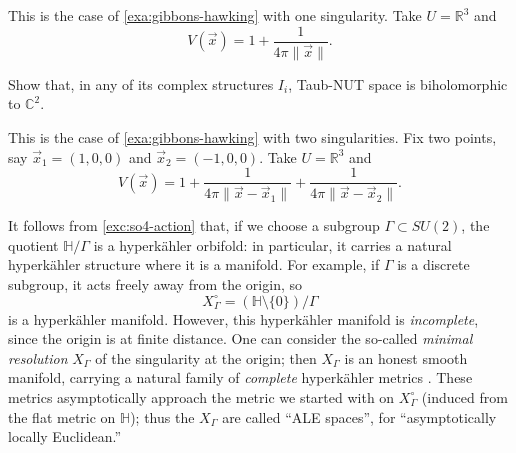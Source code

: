 \documentclass[12pt,letterpaper,reqno]{amsart}
\numberwithin{equation}{section}
\newcommand{\R}{\ensuremath{\mathbb R}}
\newcommand{\C}{\ensuremath{\mathbb C}}
\newcommand{\bbH}{\ensuremath{\mathbb H}}
\newcommand{\hk}{hyperk\"ahler\xspace}
\newcommand{\norm}[1]{\lVert#1\rVert}
\newcommand{\ti}[1]{\textit{#1}}
\newcommand{\fixme}[1]{{\color{blue}{[#1]}}}
\begin{document}
\begin{example}
This is the case of \autoref{exa:gibbons-hawking}
with one singularity. 
Take $U = \R^3$ and
\begin{equation}
  V(\vec x) = 1 + \frac{1}{4 \pi \norm{\vec x}}.
\end{equation}
\fixme{...}
\end{example}

\begin{exercise}
Show that, in any of its complex structures $I_i$, 
Taub-NUT space is biholomorphic to $\C^2$.
\end{exercise}

\begin{example}
This is the case of \autoref{exa:gibbons-hawking}
with two singularities. Fix two points, say
$\vec x_1 = (1,0,0)$ and $\vec x_2 = (-1,0,0)$.
Take $U = \R^3$ and 
\begin{equation}
  V(\vec x) = 1 + \frac{1}{4 \pi \norm{\vec x-\vec x_1}} + \frac{1}{4 \pi \norm{\vec x-\vec x_2}}.
\end{equation}
\fixme{...}
\end{example}


\begin{example}
It follows from \autoref{exc:so4-action} that, if we choose a subgroup
$\Gamma \subset SU(2)$, the quotient
$\bbH / \Gamma$ is a \hk orbifold: in particular, it
carries a natural \hk structure 
where it is a manifold. For example,
if $\Gamma$ is a discrete subgroup, it acts
freely away from the origin, so
\begin{equation}
X_\Gamma^\circ = (\bbH \setminus \{0\}) / \Gamma  
\end{equation}
is a \hk manifold.
However, this \hk manifold is \ti{incomplete},
since the origin is at finite distance.
One can consider the so-called 
\ti{minimal resolution} $X_\Gamma$
of the singularity at the origin;
then $X_\Gamma$ is an honest smooth manifold, 
carrying a natural family 
of \ti{complete} \hk metrics \cite{MR90d:53055}.
These metrics asymptotically approach
the metric we started with on $X_\Gamma^\circ$
(induced from the flat metric on $\bbH$);
thus the $X_\Gamma$ are called ``ALE spaces'',
for ``asymptotically locally Euclidean.''
\end{example}
\end{document}
